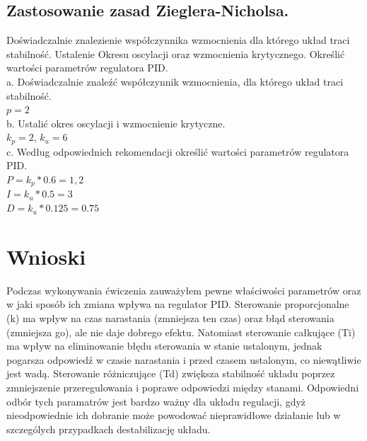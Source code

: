 \documentclass[a4paper,10pt]{article}
\begin{document}
\subsection{Zastosowanie zasad Zieglera-Nicholsa.}\label{sec:zad3}
Doświadczalnie znalezienie współczynnika wzmocnienia dla którego układ traci stabilność.
Ustalenie Okresu oscylacji oraz wzmocnienia krytycznego.
Określić wartości parametrów regulatora PID.\\

\noindent a. Doświadczalnie znaleźć współczynnik wzmocnienia, dla którego układ traci stabilność. \\

\noindent $p = 2$ \\

\noindent b. Ustalić okres oscylacji i wzmocnienie krytyczne. \\

\noindent $k_{p} = 2$, 
$k_{u} = 6$ \\

\noindent c. Według odpowiednich rekomendacji określić wartości parametrów regulatora PID.\\

\noindent $P = k_{p} * 0.6 = 1,2$ \\
$I = k_{u}  * 0.5 = 3$ \\
$D = k_{u} * 0.125 = 0.75$

\section{Wnioski}
Podczas wykonywania ćwiczenia zauważyłem pewne właściwości parametrów oraz w jaki sposób ich zmiana wpływa na regulator PID. Sterowanie proporcjonalne (k) ma wpływ na czas narastania (zmniejsza ten czas) oraz błąd sterowania (zmniejsza go), ale nie daje dobrego efektu. 
Natomiast sterowanie całkujące (Ti) ma wpływ na eliminowanie błędu sterowania w stanie ustalonym, jednak pogarsza odpowiedź w czasie narastania i przed czasem ustalonym, co niewątliwie jest wadą.
Sterowanie różniczujące (Td) zwiększa stabilność układu poprzez zmniejszenie przeregulowania i poprawe odpowiedzi między stanami. Odpowiedni odbór tych paramatrów jest bardzo ważny dla układu regulacji, gdyż nieodpowiednie ich dobranie może powodować nieprawidłowe działanie lub w szczególych przypadkach destabilizację układu.
\end{document}
